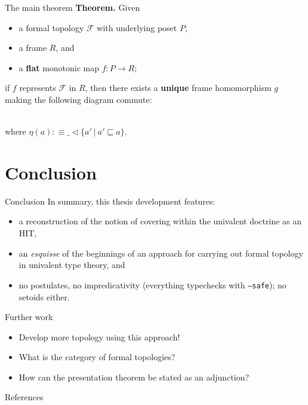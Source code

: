 \documentclass[xcolor={dvipsnames}]{beamer}
\newcommand{\fix}[2]{\mathfrak{fix}\left(#1, #2\right)}
\newcommand{\McF}{\mathcal{F}}
\newcommand{\is}{:\equiv}
\newcommand{\covers}[2]{#1 \lhd #2}
\begin{document}
\begin{frame}[fragile]{The main theorem}
  \textbf{Theorem.} Given
  \begin{itemize}
    \item a formal topology $\McF{}$ with underlying poset $P$,
    \item a frame $R$, and
    \item a \textbf{flat} monotonic map $f : P \rightarrow R$;
  \end{itemize}
  \begin{center}
    if $f$ represents $\McF{}$ in $R$, then there exists a \textbf{unique} frame
    homomorphism $g$ making the following diagram commute:
  \end{center}

  \begin{center}
    \\
    \vspace{0.5em}
    {\footnotesize where $\eta(a) \is \covers{\_}{ \{ a' ~|~ a' \sqsubseteq a \} }$.}
  \end{center}
\end{frame}

\section{Conclusion}

\begin{frame}[noframenumbering]{Conclusion}
  In summary, this thesis development features:
  \begin{itemize}
    \item a reconstruction of the notion of covering within the univalent doctrine as an
      HIT,
    \item an \emph{esquisse} of the beginnings of an approach for carrying out formal
      topology in univalent type theory, and
    \item no postulates, no impredicativity (everything typechecks with
      {\small \texttt{--safe}}); no setoids either.
  \end{itemize}
\end{frame}

\begin{frame}[noframenumbering]{Further work}
  \begin{itemize}
    \item Develop more topology using this approach!
    \item What is the category of formal topologies?
    \item How can the presentation theorem be stated as an adjunction?
  \end{itemize}
\end{frame}

\begin{frame}{References}
  \printbibliography[heading=none]
\end{frame}
\end{document}
